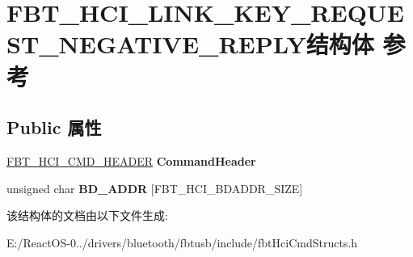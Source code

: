 \hypertarget{struct_f_b_t___h_c_i___l_i_n_k___k_e_y___r_e_q_u_e_s_t___n_e_g_a_t_i_v_e___r_e_p_l_y}{}\section{F\+B\+T\+\_\+\+H\+C\+I\+\_\+\+L\+I\+N\+K\+\_\+\+K\+E\+Y\+\_\+\+R\+E\+Q\+U\+E\+S\+T\+\_\+\+N\+E\+G\+A\+T\+I\+V\+E\+\_\+\+R\+E\+P\+L\+Y结构体 参考}
\label{struct_f_b_t___h_c_i___l_i_n_k___k_e_y___r_e_q_u_e_s_t___n_e_g_a_t_i_v_e___r_e_p_l_y}
\subsection*{Public 属性}
\begin{DoxyCompactItemize}
\item 
\mbox{\label{struct_f_b_t___h_c_i___l_i_n_k___k_e_y___r_e_q_u_e_s_t___n_e_g_a_t_i_v_e___r_e_p_l_y_a1b8491b4d4aaa3c36513cd01e84bb57b}} 
\hyperlink{struct_f_b_t___h_c_i___c_m_d___h_e_a_d_e_r}{F\+B\+T\+\_\+\+H\+C\+I\+\_\+\+C\+M\+D\+\_\+\+H\+E\+A\+D\+ER} {\bfseries Command\+Header}
\item 
\mbox{\label{struct_f_b_t___h_c_i___l_i_n_k___k_e_y___r_e_q_u_e_s_t___n_e_g_a_t_i_v_e___r_e_p_l_y_a185914b2013e252f3e8750c4e3b1c5c6}} 
unsigned char {\bfseries B\+D\+\_\+\+A\+D\+DR} \mbox{[}F\+B\+T\+\_\+\+H\+C\+I\+\_\+\+B\+D\+A\+D\+D\+R\+\_\+\+S\+I\+ZE\mbox{]}
\end{DoxyCompactItemize}


该结构体的文档由以下文件生成\+:\begin{DoxyCompactItemize}
\item 
E\+:/\+React\+O\+S-\/0../drivers/bluetooth/fbtusb/include/fbt\+Hci\+Cmd\+Structs.\+h\end{DoxyCompactItemize}
